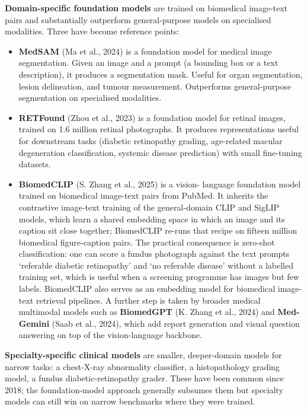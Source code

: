\documentclass[
  letterpaper,
  11pt]{scrbook}
\begin{document}
\textbf{Domain-specific foundation models} are trained on biomedical
image-text pairs and substantially outperform general-purpose models on
specialised modalities. Three have become reference points:

\begin{itemize}
\item
  \textbf{MedSAM} (Ma et al., 2024) is a foundation model for medical
  image segmentation. Given an image and a prompt (a bounding box or a
  text description), it produces a segmentation mask. Useful for organ
  segmentation, lesion delineation, and tumour measurement. Outperforms
  general-purpose segmentation on specialised modalities.
\item
  \textbf{RETFound} ({Zhou et al.}, 2023) is a foundation model for
  retinal images, trained on 1.6 million retinal photographs. It
  produces representations useful for downstream tasks (diabetic
  retinopathy grading, age-related macular degeneration classification,
  systemic disease prediction) with small fine-tuning datasets.
\item
  \textbf{BiomedCLIP} (S. Zhang et al., 2025) is a vision- language
  foundation model trained on biomedical image-text pairs from PubMed.
  It inherits the contrastive image-text training of the general-domain
  CLIP and SigLIP models, which learn a shared embedding space in which
  an image and its caption sit close together; BiomedCLIP re-runs that
  recipe on fifteen million biomedical figure-caption pairs. The
  practical consequence is zero-shot classification: one can score a
  fundus photograph against the text prompts `referable diabetic
  retinopathy' and `no referable disease' without a labelled training
  set, which is useful when a screening programme has images but few
  labels. BiomedCLIP also serves as an embedding model for biomedical
  image-text retrieval pipelines. A further step is taken by broader
  medical multimodal models such as \textbf{BiomedGPT} ({K. Zhang et
  al.}, 2024) and \textbf{Med-Gemini} ({Saab et al.}, 2024), which add
  report generation and visual question answering on top of the
  vision-language backbone.
\end{itemize}

\textbf{Specialty-specific clinical models} are smaller, deeper-domain
models for narrow tasks: a chest-X-ray abnormality classifier, a
histopathology grading model, a fundus diabetic-retinopathy grader.
These have been common since 2018; the foundation-model approach
generally subsumes them but specialty models can still win on narrow
benchmarks where they were trained.
\end{document}
